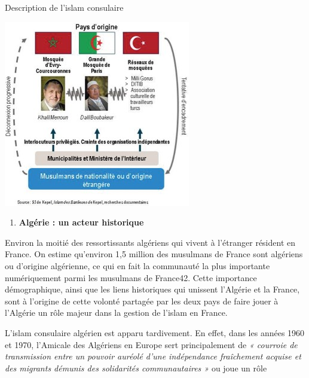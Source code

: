 Description de l'islam consulaire

\includegraphics[width=\textwidth]{ImageIslamFrance/media/image7.jpeg}

\begin{enumerate}
\def\labelenumi{\arabic{enumi}.}
\item
  \textbf{Algérie : un acteur historique}
\end{enumerate}


Environ la moitié des ressortissants algériens qui vivent à l'étranger
résident en France. On estime qu'environ 1,5 million des musulmans de
France sont algériens ou d'origine algérienne, ce qui en fait la
communauté la plus importante numériquement parmi les musulmans de
France42. Cette importance démographique, ainsi que les liens
historiques qui unissent l'Algérie et la France, sont à l'origine de
cette volonté partagée par les deux pays de faire jouer à l'Algérie un
rôle majeur dans la gestion de l'islam en France.

L'islam consulaire algérien est apparu tardivement. En effet, dans les
années 1960 et 1970, l'Amicale des Algériens en Europe sert
principalement de \emph{« courroie de transmission entre un pouvoir
auréolé d'une indépendance fraîchement acquise et des migrants démunis
des solidarités communautaires »} ou joue un rôle

